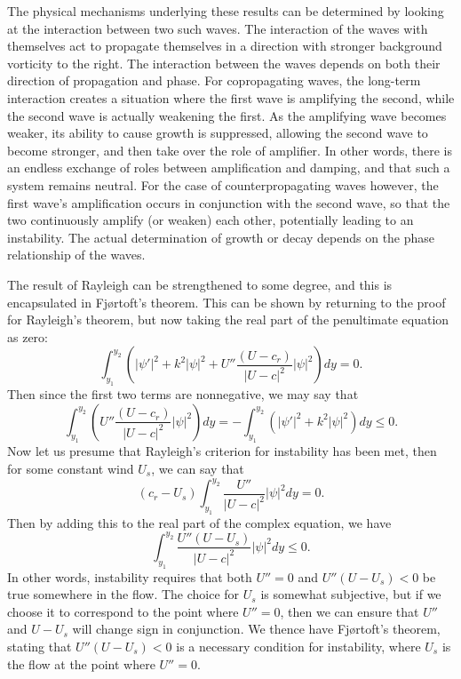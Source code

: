 \documentclass[letterpaper, 11pt, onecolumn]{article}
\begin{document}
The physical mechanisms underlying these results can be determined by looking at the interaction between two such waves. The interaction of the waves with themselves act to propagate themselves in a direction with stronger background vorticity to the right. The interaction between the waves depends on both their direction of propagation and phase. For copropagating waves, the long-term interaction creates a situation where the first wave is amplifying the second, while the second wave is actually weakening the first. As the amplifying wave becomes weaker, its ability to cause growth is suppressed, allowing the second wave to become stronger, and then take over the role of amplifier. In other words, there is an endless exchange of roles between amplification and damping, and that such a system remains neutral. For the case of counterpropagating waves however, the first wave's amplification occurs in conjunction with the second wave, so that the two continuously amplify (or weaken) each other, potentially leading to an instability. The actual determination of growth or decay depends on the phase relationship of the waves.

The result of Rayleigh can be strengthened to some degree, and this is encapsulated in Fj\o rtoft's theorem. This can be shown by returning to the proof for Rayleigh's theorem, but now taking the real part of the penultimate equation as zero:
\begin{equation*}
\int_{y_1}^{y_2} \left(|\psi'|^2 + k^2 |\psi|^2 + U'' \frac{(U - c_r)}{|U - c|^2}|\psi|^2 \right) dy = 0.
\end{equation*}
Then since the first two terms are nonnegative, we may say that
\begin{equation*}
\int_{y_1}^{y_2} \left(U'' \frac{(U - c_r)}{|U - c|^2}|\psi|^2 \right) dy = -\int_{y_1}^{y_2} \left(|\psi'|^2 + k^2 |\psi|^2 \right) dy \leq 0.
\end{equation*}
Now let us presume that Rayleigh's criterion for instability has been met, then for some constant wind $U_s$, we can say that
\begin{equation*}
(c_r - U_s) \int_{y_1}^{y_2} \frac{U''}{|U - c|^2} |\psi|^2 dy = 0.
\end{equation*}
Then by adding this to the real part of the complex equation, we have
\begin{equation}
\int_{y_1}^{y_2} \frac{U'' (U - U_s)}{|U - c|^2} |\psi|^2 dy \leq 0.
\end{equation}
In other words, instability requires that both $U'' = 0$ and $U''(U - U_s) < 0$ be true somewhere in the flow. The choice for $U_s$ is somewhat subjective, but if we choose it to correspond to the point where $U'' = 0$, then we can ensure that $U''$ and $U - U_s$ will change sign in conjunction. We thence have Fj\o rtoft's theorem, stating that $U''(U - U_s) < 0$ is a necessary condition for instability, where $U_s$ is the flow at the point where $U'' = 0$.
\end{document}
